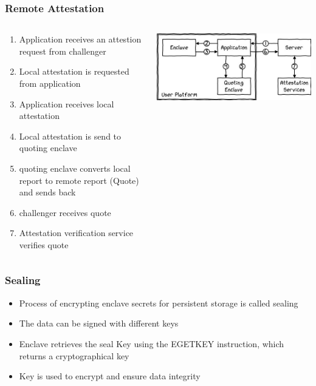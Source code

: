\begin{frame}
    \frametitle{Remote Attestation}
    \begin{columns}
        \begin{column}{0.4\textwidth}
            \begin{enumerate}[<+->]
                \item Application receives an attestion request from challenger
                \item Local attestation is requested from application
                \item Application receives local attestation
                \item Local attestation is send to quoting enclave
                \item quoting enclave converts local report to remote report (Quote) and sends back
                \item challenger receives quote
                \item Attestation verification service verifies quote
            \end{enumerate}
        \end{column}
        \begin{column}{0.6\textwidth}
            \includegraphics[scale=0.4]{Images/remote_attestation.png}
        \end{column}
    \end{columns}
\end{frame}

\begin{frame}
    \frametitle{Sealing}
    \begin{itemize}[<+->]
        \item Process of encrypting enclave secrets for persistent storage is called sealing
        \item The data can be signed with different keys
        \item Enclave retrieves the seal Key using the EGETKEY instruction, which returns a cryptographical key
        \item Key is used to encrypt and ensure data integrity
    \end{itemize}
\end{frame}

